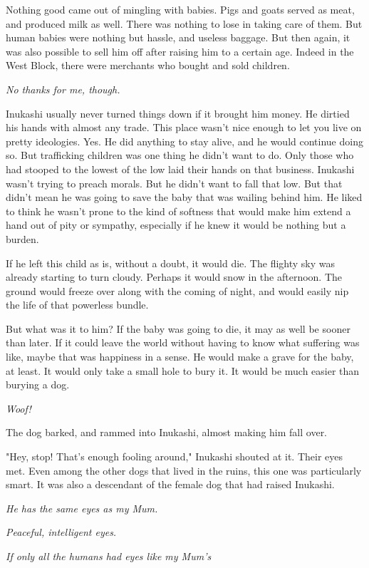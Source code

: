 Nothing good came out of mingling with babies. Pigs and goats served as
meat, and produced milk as well. There was nothing to lose in taking
care of them. But human babies were nothing but hassle, and useless
baggage. But then again, it was also possible to sell him off after
raising him to a certain age. Indeed in the West Block, there were
merchants who bought and sold children.

\emph{No thanks for me, though.}

Inukashi usually never turned things down if it brought him money. He
dirtied his hands with almost any trade. This place wasn't nice enough
to let you live on pretty ideologies. Yes. He did anything to stay
alive, and he would continue doing so. But trafficking children was one
thing he didn't want to do. Only those who had stooped to the lowest of
the low laid their hands on that business. Inukashi wasn't trying to
preach morals. But he didn't want to fall that low. But that didn't mean
he was going to save the baby that was wailing behind him. He liked to
think he wasn't prone to the kind of softness that would make him extend
a hand out of pity or sympathy, especially if he knew it would be
nothing but a burden.

If he left this child as is, without a doubt, it would die. The flighty
sky was already starting to turn cloudy. Perhaps it would snow in the
afternoon. The ground would freeze over along with the coming of night,
and would easily nip the life of that powerless bundle.

But what was it to him? If the baby was going to die, it may as well be
sooner than later. If it could leave the world without having to know
what suffering was like, maybe that was happiness in a sense. He would
make a grave for the baby, at least. It would only take a small hole to
bury it. It would be much easier than burying a dog.

\emph{Woof!}

The dog barked, and rammed into Inukashi, almost making him fall over.

"Hey, stop! That's enough fooling around," Inukashi shouted at it. Their
eyes met. Even among the other dogs that lived in the ruins, this one
was particularly smart. It was also a descendant of the female dog that
had raised Inukashi.

\emph{He has the same eyes as my Mum.}

\emph{Peaceful, intelligent eyes.}

\emph{If only all the humans had eyes like my Mum's\el }

